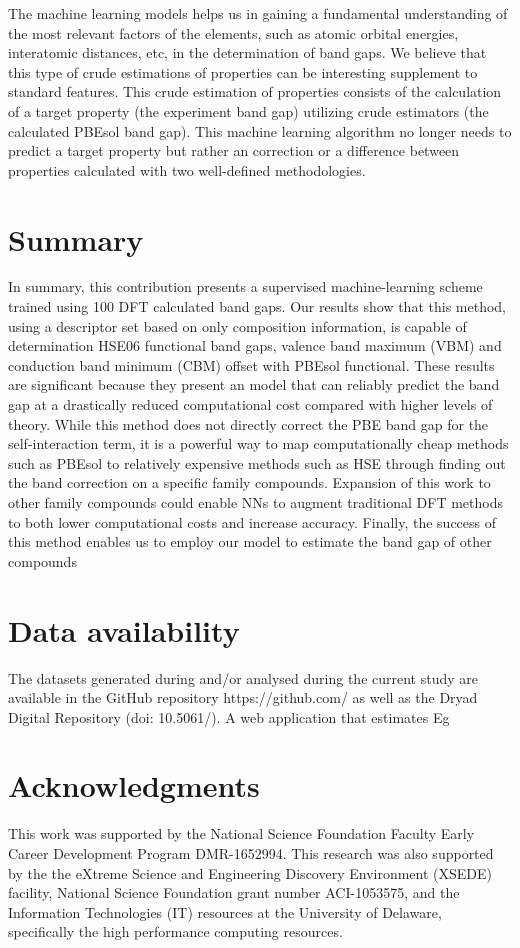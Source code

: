 \documentclass[twocolumn,
superscriptaddress,
 amsmath,amssymb,
 aps, citeautoscript,
prb,
]{revtex4-1}
\begin{document}
The machine learning models helps us in gaining a fundamental understanding of the most relevant factors of the elements, such as atomic orbital energies, interatomic distances, etc, in the determination of band gaps. We believe that this type of crude estimations of properties can be interesting supplement to standard features.  This crude estimation of properties consists of the calculation of a target property (the experiment band gap) utilizing crude estimators (the calculated PBEsol band gap). This machine learning algorithm no longer needs to predict a target property but rather an correction or a difference between properties calculated with two well-defined methodologies. 



\section{Summary}

In summary, this contribution presents a supervised machine-learning scheme trained using 100 DFT calculated band gaps. Our results show that this method, using a descriptor set based on only composition information, is capable of determination HSE06 functional band gaps, valence band maximum (VBM) and conduction band minimum (CBM) offset with PBEsol functional. 
These results are significant because they present an model that can reliably predict the band gap at a drastically reduced computational cost compared with higher levels of theory.
While this method does not directly correct the PBE band gap for the self-interaction term, it is a powerful way to map computationally cheap methods such as PBEsol to relatively expensive methods such as HSE through finding out the band correction on a specific family compounds. Expansion of this work to other family compounds could enable NNs to augment traditional DFT methods to both lower computational costs and increase accuracy. 
Finally, the success of this method enables us to employ our model to estimate the band gap of other compounds 

\section{Data availability}

The datasets generated during and/or analysed during the current study are available in
the GitHub repository https://github.com/ as well as the
Dryad Digital Repository (doi: 10.5061/). A web application that estimates Eg 

\section{Acknowledgments}

This work was supported by the National Science Foundation Faculty Early Career Development Program DMR-1652994. This research was also supported by the the eXtreme Science and Engineering Discovery Environment (XSEDE) facility, National Science Foundation grant number ACI-1053575, and the Information Technologies (IT) resources at the University of Delaware, specifically the high performance computing resources.


\end{document}
